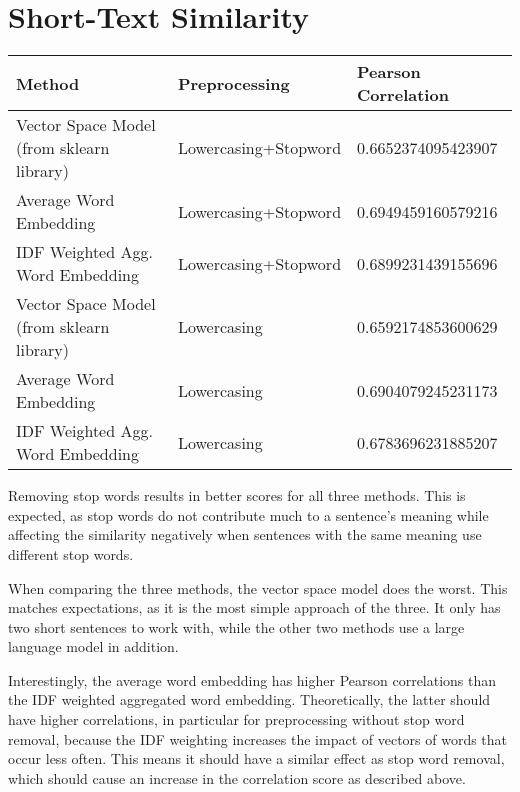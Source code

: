 \section{Short-Text Similarity}

\begin{table}[h]
\center
\begin{tabular}{|l|l|l|}
\hline
\textbf{Method}                           & \textbf{Preprocessing} & \textbf{Pearson Correlation} \\ \hline
Vector Space Model (from sklearn library) & Lowercasing+Stopword   & 0.6652374095423907           \\ \hline
Average Word Embedding                    & Lowercasing+Stopword   & 0.6949459160579216           \\ \hline
IDF Weighted Agg. Word Embedding          & Lowercasing+Stopword   & 0.6899231439155696           \\ \hline
Vector Space Model (from sklearn library) & Lowercasing            & 0.6592174853600629           \\ \hline
Average Word Embedding                    & Lowercasing            & 0.6904079245231173           \\ \hline
IDF Weighted Agg. Word Embedding          & Lowercasing            & 0.6783696231885207           \\ \hline
\end{tabular}
\end{table}

Removing stop words results in better scores for all three methods.
This is expected, as stop words do not contribute much to a sentence's meaning while affecting the similarity negatively when sentences with the same meaning use different stop words.

When comparing the three methods, the vector space model does the worst.
This matches expectations, as it is the most simple approach of the three.
It only has two short sentences to work with, while the other two methods use a large language model in addition.

Interestingly, the average word embedding has higher Pearson correlations than the IDF weighted aggregated word embedding.
Theoretically, the latter should have higher correlations, in particular for preprocessing without stop word removal, because the IDF weighting increases the impact of vectors of words that occur less often.
This means it should have a similar effect as stop word removal, which should cause an increase in the correlation score as described above.

